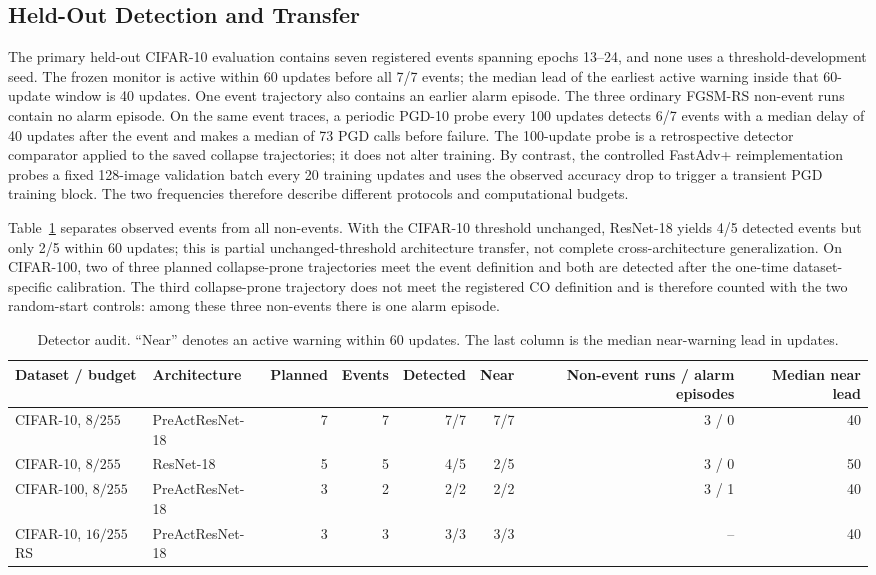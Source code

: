 \subsection{Held-Out Detection and Transfer}
The primary held-out CIFAR-10 evaluation contains seven registered events
spanning epochs 13--24, and none uses a threshold-development seed. The frozen
monitor is active within 60 updates before all 7/7 events; the median lead of
the earliest active warning inside that 60-update window is 40 updates. One
event trajectory also contains an earlier alarm episode. The three ordinary
FGSM-RS non-event runs contain no alarm episode. On the same event traces, a
periodic PGD-10 probe every 100 updates detects 6/7 events with a median delay
of 40 updates after the event and makes a median of 73 PGD calls before
failure. The 100-update probe is a retrospective detector comparator applied
to the saved collapse trajectories; it does not alter training. By contrast,
the controlled FastAdv+ reimplementation probes a fixed 128-image validation
batch every 20 training updates and uses the observed accuracy drop to trigger
a transient PGD training block. The two frequencies therefore describe
different protocols and computational budgets.

Table~\ref{tab:transfer} separates observed events from all non-events. With
the CIFAR-10 threshold unchanged, ResNet-18 yields 4/5 detected events but only
2/5 within 60 updates; this is partial unchanged-threshold architecture
transfer, not complete cross-architecture generalization. On CIFAR-100, two of
three planned collapse-prone trajectories meet the event definition and both
are detected after the one-time dataset-specific calibration. The third
collapse-prone trajectory does not meet the registered CO definition and is
therefore counted with the two random-start controls: among these three
non-events there is one alarm episode.

\begin{table}[t]
\centering
\caption{Detector audit. ``Near'' denotes an active warning within 60 updates.
The last column is the median near-warning lead in updates.}
\label{tab:transfer}
\footnotesize
\setlength{\tabcolsep}{4pt}
\begin{tabular}{llrrrrrr}
\toprule
Dataset / budget & Architecture & Planned & Events & Detected & Near & Non-event runs / alarm episodes & Median near lead \\
\midrule
CIFAR-10, $8/255$ & PreActResNet-18 & 7 & 7 & 7/7 & 7/7 & 3 / 0 & 40 \\
CIFAR-10, $8/255$ & ResNet-18 & 5 & 5 & 4/5 & 2/5 & 3 / 0 & 50 \\
CIFAR-100, $8/255$ & PreActResNet-18 & 3 & 2 & 2/2 & 2/2 & 3 / 1 & 40 \\
CIFAR-10, $16/255$ RS & PreActResNet-18 & 3 & 3 & 3/3 & 3/3 & -- & 40 \\
\bottomrule
\end{tabular}
\end{table}

